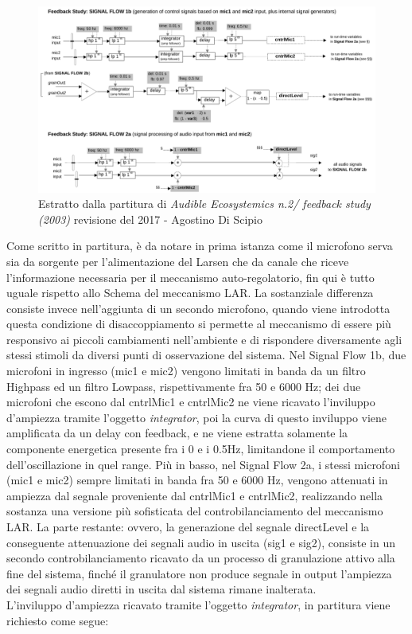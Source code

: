 \begin{figure}[h!]
\begin{center}
\includegraphics[width=14cm]{figures/LARFeedbackstudy2017.pdf}
\caption{Estratto dalla partitura di \textit{Audible Ecosystemics n.2/ feedback study (2003)}
revisione del 2017 - Agostino Di Scipio}
\vspace{0.5cm}
\end{center}
\end{figure}

Come scritto in partitura, è da notare in prima istanza
come il microfono serva sia da sorgente per l'alimentazione del Larsen che
da canale che riceve l'informazione necessaria per il meccanismo auto-regolatorio,
fin qui è tutto uguale rispetto allo Schema del meccanismo LAR.
La sostanziale differenza consiste invece nell'aggiunta di un secondo microfono,
quando viene introdotta questa condizione di disaccoppiamento si 
permette al meccanismo di essere più responsivo ai piccoli cambiamenti nell'ambiente
e di rispondere diversamente agli stessi stimoli da diversi punti di osservazione del sistema.
Nel Signal Flow 1b, due microfoni in ingresso (mic1 e mic2) 
vengono limitati in banda da un filtro Highpass ed 
un filtro Lowpass, rispettivamente fra 50 e 6000 Hz; dei due microfoni che escono 
dal cntrlMic1 e cntrlMic2 ne viene ricavato l'inviluppo d'ampiezza tramite
l'oggetto \textit{integrator}, poi la curva di questo inviluppo viene amplificata da 
un delay con feedback, e ne viene estratta solamente la componente energetica 
presente fra i 0 e i 0.5Hz, limitandone il comportamento dell'oscillazione in quel range.
Più in basso, nel Signal Flow 2a, i stessi microfoni (mic1 e mic2) sempre
limitati in banda fra 50 e 6000 Hz, vengono attenuati in ampiezza dal segnale
proveniente dal cntrlMic1 e cntrlMic2, realizzando nella sostanza una 
versione più sofisticata del controbilanciamento del meccanismo LAR.
La parte restante: ovvero, la generazione del segnale directLevel e la 
conseguente attenuazione dei segnali audio in uscita (sig1 e sig2),
consiste in un secondo controbilanciamento ricavato da un processo di granulazione
attivo alla fine del sistema, finché il granulatore non produce segnale in output 
l'ampiezza dei segnali audio diretti in uscita dal sistema rimane inalterata. \\
L'inviluppo d'ampiezza ricavato tramite l'oggetto \textit{integrator}, in partitura 
viene richiesto come segue:

